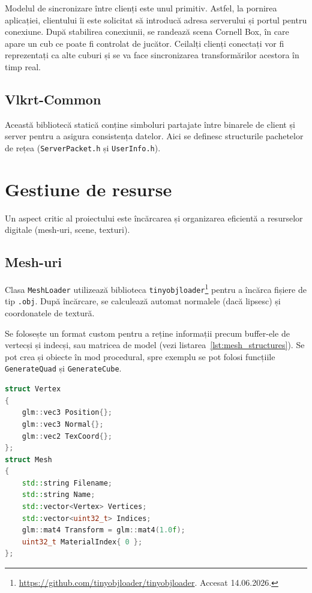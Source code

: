\documentclass[12pt,a4paper]{report}
\numberwithin{equation}{section} %
\begin{document}
Modelul de sincronizare între clienți este unul primitiv.
Astfel, la pornirea aplicației, clientului îi este solicitat să introducă adresa serverului și portul pentru conexiune.
După stabilirea conexiunii, se randează scena Cornell Box, în care apare un cub ce poate fi controlat de jucător.
Ceilalți clienți conectați vor fi reprezentați ca alte cuburi și se va face sincronizarea transformărilor acestora în timp real.

\subsection{Vlkrt-Common}

Această bibliotecă statică conține simboluri partajate între binarele de client și server pentru a asigura consistența datelor.
Aici se definesc structurile pachetelor de rețea (\texttt{ServerPacket.h} și \texttt{UserInfo.h}). 

\section{Gestiune de resurse}

Un aspect critic al proiectului este încărcarea și organizarea eficientă a resurselor digitale (mesh-uri, scene, texturi).

\subsection{Mesh-uri}

Clasa \texttt{MeshLoader} utilizează biblioteca \texttt{tinyobjloader}\footnote{\url{https://github.com/tinyobjloader/tinyobjloader}. Accesat 14.06.2026.} pentru a încărca fișiere de tip \texttt{.obj}.
După încărcare, se calculează automat normalele (dacă lipsesc) și coordonatele de textură.

Se folosește un format custom pentru a reține informații precum buffer-ele de vertecși și indecși, sau matricea de model (vezi listarea~\ref{lst:mesh_structures}).
Se pot crea și obiecte în mod procedural, spre exemplu se pot folosi funcțiile \texttt{GenerateQuad} și \texttt{GenerateCube}.

\begin{lstlisting}[caption={Structuri pentru vertecși și mesh-uri.}, language=C++, label={lst:mesh_structures}, frame=single]
struct Vertex
{
	glm::vec3 Position{};
	glm::vec3 Normal{};
	glm::vec2 TexCoord{};
};
struct Mesh
{
	std::string Filename;
	std::string Name;
	std::vector<Vertex> Vertices;
	std::vector<uint32_t> Indices;
	glm::mat4 Transform = glm::mat4(1.0f);
	uint32_t MaterialIndex{ 0 };
};
\end{lstlisting}
\end{document}
